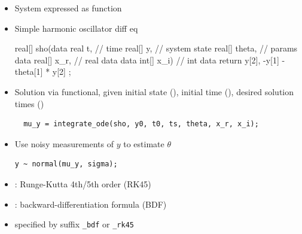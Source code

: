 \documentclass[10pt]{report}
\begin{document}
%
\begin{itemize}
\item System expressed as function
\item Simple harmonic oscillator diff eq
\begin{stancode}
  real[] sho(data real t,        // time
             real[] y,           // system state
             real[] theta,       // params
             data real[] x_r,    // real data
             data int[] x_i) {   // int data
    return { y[2],
             -y[1] - theta[1] * y[2] };
 }
\end{stancode}
\end{itemize}


%
\begin{itemize}
\item Solution via functional, given initial state (),
initial time (), desired solution times ()
{\footnotesize
\begin{Verbatim}
  mu_y = integrate_ode(sho, y0, t0, ts, theta, x_r, x_i);
\end{Verbatim}
}
\item Use noisy measurements of $y$ to estimate $\theta$
\begin{Verbatim}
y ~ normal(mu_y, sigma);
\end{Verbatim}
\end{itemize}


%
\begin{itemize}
\item {}: Runge-Kutta 4th/5th order (RK45)
\item {}:  backward-differentiation formula (BDF)
\item specified by suffix \Verb|_bdf| or \Verb|_rk45|
\end{itemize}
\end{document}
